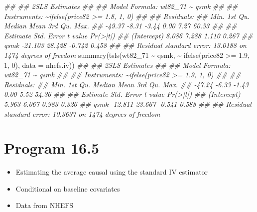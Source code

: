 \documentclass[
  10pt,
  a4paper,
]{book}
\newenvironment{Shaded}{\begin{snugshade}}{\end{snugshade}}
\newcommand{\AttributeTok}[1]{\textcolor[rgb]{0.40,0.45,0.13}{#1}}
\newcommand{\DecValTok}[1]{\textcolor[rgb]{0.68,0.00,0.00}{#1}}
\newcommand{\DocumentationTok}[1]{\textcolor[rgb]{0.37,0.37,0.37}{\textit{#1}}}
\newcommand{\FloatTok}[1]{\textcolor[rgb]{0.68,0.00,0.00}{#1}}
\newcommand{\FunctionTok}[1]{\textcolor[rgb]{0.28,0.35,0.67}{#1}}
\newcommand{\NormalTok}[1]{\textcolor[rgb]{0.00,0.46,0.62}{#1}}
\newcommand{\SpecialCharTok}[1]{\textcolor[rgb]{0.37,0.37,0.37}{#1}}
\providecommand{\tightlist}{%
  \setlength{\itemsep}{0pt}\setlength{\parskip}{0pt}}
\begin{document}
\begin{Shaded}
\begin{Highlighting}[]
\DocumentationTok{\#\# }
\DocumentationTok{\#\#  2SLS Estimates}
\DocumentationTok{\#\# }
\DocumentationTok{\#\# Model Formula: wt82\_71 \textasciitilde{} qsmk}
\DocumentationTok{\#\# }
\DocumentationTok{\#\# Instruments: \textasciitilde{}ifelse(price82 \textgreater{}= 1.8, 1, 0)}
\DocumentationTok{\#\# }
\DocumentationTok{\#\# Residuals:}
\DocumentationTok{\#\#    Min. 1st Qu.  Median    Mean 3rd Qu.    Max. }
\DocumentationTok{\#\#  {-}49.37   {-}8.31   {-}3.44    0.00    7.27   60.53 }
\DocumentationTok{\#\# }
\DocumentationTok{\#\#             Estimate Std. Error t value Pr(\textgreater{}|t|)}
\DocumentationTok{\#\# (Intercept)    8.086      7.288   1.110    0.267}
\DocumentationTok{\#\# qsmk         {-}21.103     28.428  {-}0.742    0.458}
\DocumentationTok{\#\# }
\DocumentationTok{\#\# Residual standard error: 13.0188 on 1474 degrees of freedom}
\FunctionTok{summary}\NormalTok{(}\FunctionTok{tsls}\NormalTok{(wt82\_71 }\SpecialCharTok{\textasciitilde{}}\NormalTok{ qsmk, }\SpecialCharTok{\textasciitilde{}} \FunctionTok{ifelse}\NormalTok{(price82 }\SpecialCharTok{\textgreater{}=} \FloatTok{1.9}\NormalTok{, }\DecValTok{1}\NormalTok{, }\DecValTok{0}\NormalTok{), }\AttributeTok{data =}\NormalTok{ nhefs.iv))}
\DocumentationTok{\#\# }
\DocumentationTok{\#\#  2SLS Estimates}
\DocumentationTok{\#\# }
\DocumentationTok{\#\# Model Formula: wt82\_71 \textasciitilde{} qsmk}
\DocumentationTok{\#\# }
\DocumentationTok{\#\# Instruments: \textasciitilde{}ifelse(price82 \textgreater{}= 1.9, 1, 0)}
\DocumentationTok{\#\# }
\DocumentationTok{\#\# Residuals:}
\DocumentationTok{\#\#    Min. 1st Qu.  Median    Mean 3rd Qu.    Max. }
\DocumentationTok{\#\#  {-}47.24   {-}6.33   {-}1.43    0.00    5.52   54.36 }
\DocumentationTok{\#\# }
\DocumentationTok{\#\#             Estimate Std. Error t value Pr(\textgreater{}|t|)}
\DocumentationTok{\#\# (Intercept)    5.963      6.067   0.983    0.326}
\DocumentationTok{\#\# qsmk         {-}12.811     23.667  {-}0.541    0.588}
\DocumentationTok{\#\# }
\DocumentationTok{\#\# Residual standard error: 10.3637 on 1474 degrees of freedom}
\end{Highlighting}
\end{Shaded}

\section{Program 16.5}\label{program-16.5}

\begin{itemize}
\tightlist
\item
  Estimating the average causal using the standard IV estimator
\item
  Conditional on baseline covariates
\item
  Data from NHEFS
\end{itemize}
\end{document}
